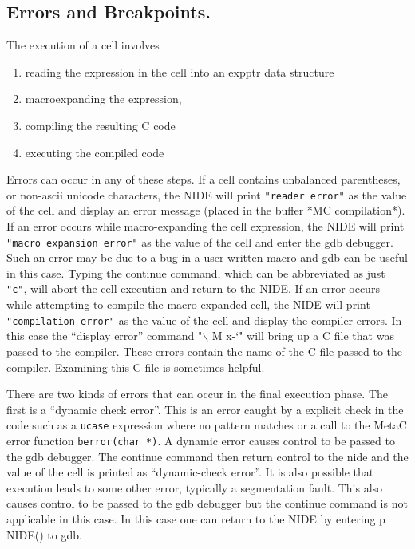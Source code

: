 \documentclass{article}
\begin{document}
\subsection{Errors and Breakpoints.}

The execution of a cell involves

\begin{enumerate}
  \item reading the expression in the cell into an expptr data structure
  \item macroexpanding the expression,
  \item compiling the resulting C code
  \item executing the compiled code
\end{enumerate}

Errors can occur in any of these steps. If a cell contains unbalanced parentheses, or non-ascii unicode characters, the NIDE will print
{\tt "reader error"} as the value of the cell and display an error message (placed in the buffer *MC compilation*).
If an error occurs while macro-expanding the cell expression, the NIDE will print {\tt "macro expansion error"}
as the value of the cell and enter the
gdb debugger.  Such an error may be
due to a bug in a user-written macro and gdb can be useful in this case.
Typing the continue command, which can be abbreviated as just {\tt "c"}, will abort the cell execution and return to the NIDE.
If an error occurs while attempting to compile the macro-expanded cell, the NIDE will print {\tt "compilation error"} as the value of the cell
and display the compiler errors.  In this case the ``display error'' command "$\backslash$ M x-`" will bring up a C file that was passed to the compiler.
These errors contain the name of the C file passed to the compiler.  Examining this C file is sometimes helpful.

There are two kinds of errors that can occur in the final execution phase.  The first is a ``dynamic check error''.  This is an error caught
by a explicit check in the code such as a {\tt ucase} expression where no pattern matches or a call to the MetaC error function {\tt berror(char *)}.
A dynamic error causes control to be passed to the gdb debugger.  The continue command then return control to the nide and the value of the cell is
printed as ``dynamic-check error''.  It is also possible that execution leads to some other error, typically a segmentation fault.  This also causes
control to be passed to the gdb debugger but the continue command is not applicable in this case.  In this case one can return to the NIDE by
entering p NIDE() to gdb.
\end{document}
